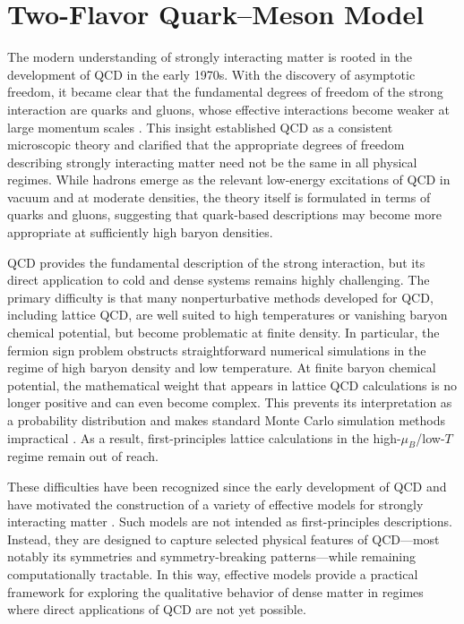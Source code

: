 \chapter{Two-Flavor Quark--Meson Model}
\label{chap:qm_model}

The modern understanding of strongly interacting matter is rooted in
the development of QCD in the early 1970s.
With the discovery of asymptotic freedom, it became clear that the
fundamental degrees of freedom of the strong interaction are quarks
and gluons, whose effective interactions become weaker at large
momentum scales \cite{GrossWilczek1973,Politzer1973}. This insight
established QCD as a consistent microscopic theory and clarified that
the appropriate degrees of freedom describing strongly interacting
matter need not be the same in all physical regimes. While hadrons
emerge as the relevant low-energy excitations of QCD in vacuum and at
moderate densities, the theory itself is formulated in terms of quarks
and gluons, suggesting that quark-based descriptions may become more
appropriate at sufficiently high baryon densities.

QCD provides the fundamental description of the strong interaction,
but its direct application to cold and dense systems remains highly
challenging. The primary difficulty is that many nonperturbative
methods developed for QCD, including lattice QCD, are well suited to
high temperatures or vanishing baryon chemical potential, but become
problematic at finite density.
In particular, the fermion sign problem obstructs straightforward
numerical simulations in the regime of high baryon density and low
temperature. At finite baryon chemical potential, the mathematical
weight that appears in lattice QCD calculations is no longer positive
and can even become complex. This prevents its interpretation as a
probability distribution and makes standard Monte Carlo simulation
methods impractical \cite{TroyerWiese2005,DeForcrand2010}. As a result,
first-principles lattice calculations in the high-$\mu_B$/low-$T$
regime remain out of reach.

These difficulties have been recognized since the early development
of QCD and have motivated the construction of a variety of effective
models for strongly interacting matter
\cite{CollinsPerry1975,BaymChin1976}. Such models are not intended as
first-principles descriptions. Instead, they are designed to capture
selected physical features of QCD—most notably its symmetries and
symmetry-breaking patterns—while remaining computationally tractable.
In this way, effective models provide a practical framework for
exploring the qualitative behavior of dense matter in regimes where
direct applications of QCD are not yet possible.

